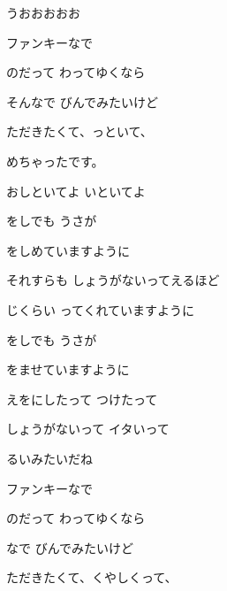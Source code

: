 \documentclass[a4paper,tate,twocolumn,12pt]{ltjtarticle}
\begin{document}
\begin{flushleft}
\begin{minipage}{\linewidth}
うおおおおお
\end{minipage}

\vspace{2em}

\noindent\begin{minipage}{\linewidth}
ファンキーなで

のだって わってゆくなら

そんなで びんでみたいけど

ただきたくて、っといて、

めちゃったです。

おしといてよ いといてよ
\end{minipage}

\vspace{2em}

\noindent\begin{minipage}{\linewidth}
をしでも うさが

をしめていますように

それすらも しょうがないってえるほど

じくらい ってくれていますように

をしでも うさが

をませていますように

えをにしたって つけたって

しょうがないって イタいって

るいみたいだね
\end{minipage}

\vspace{2em}

\noindent\begin{minipage}{\linewidth}
ファンキーなで

のだって わってゆくなら

なで びんでみたいけど

ただきたくて、くやしくって、


\end{minipage}
\end{flushleft}
\end{document}
